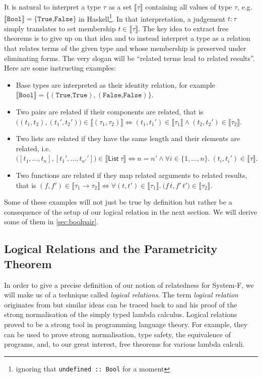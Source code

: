 \documentclass[12pt]{article}
\theoremstyle{plain}
\theoremstyle{definition}
\newcommand{\fromto}[2]{\{#1,\dotsc,#2\}}
\newcommand{\denot}[1]{\llbracket#1\rrbracket}
\newcommand{\listt}[1]{\mathsf{List}~#1}
\newcommand{\haskell}[1]{\texttt{#1}}
\begin{document}
It is natural to interpret a type $\tau$ as a set $\denot{\tau}$ containing all values of type $\tau$, e.g. $\denot{\texttt{Bool}}=\{\texttt{True,False}\}$ in Haskell\footnote{ignoring that \haskell{undefined :: Bool} for a moment}.
In that interpretation, a judgement $t : \tau$ simply translates to set membership $t\in\denot{\tau}$.
The key idea to extract free theorems is to give up on that idea and to instead interpret a type as a relation that relates terms of the given type and whose membership is preserved under eliminating forms.
The very slogan will be ``related terms lead to related results''.
Here are some instructing examples:
\begin{itemize}
  \item Base types are interpreted as their identity relation,
    for example\\
    $\denot{\haskell{Bool}}=\{(\haskell{True,True}),(\haskell{False,False})\}$.
  \item Two pairs are related if their components are related, that is\\ $\bigl((t_1,t_2),(t_1',t_2')\bigr)\in\denot{(\tau_1,\tau_2)} \iff (t_1,t_1')\in\denot{\tau_1}\land (t_2,t_2')\in\denot{\tau_2}$.
  \item Two lists are related if they have the same length and their elements are related, i.e.\ $\bigl([t_1,\dotsc,t_n],[t_1',\dotsc,t_{n'}']\bigr)\in \denot{\listt{\tau}} \iff n = n' \land \forall i\in\fromto{1}{n}.\ (t_i,t_i')\in \denot{\tau}$.
  \item Two functions are related if they map related arguments to related results, that is $(f,f')\in \denot{\tau_1 \to \tau_2} \iff \forall (t,t')\in \denot{\tau_1}.~\bigl(f\, t, f'\, t'\bigr)\in\denot{\tau_2}$.
\end{itemize}
Some of these examples will not just be true by definition but rather be a consequence of
the setup of our logical relation in the next section.
We will derive some of them in \cref{sec:boolpair}.

\subsection{Logical Relations and the Parametricity Theorem}\label{sec:logicalrel}

In order to give a precise definition of our notion of relatedness for System-F,
we will make us of a technique called \emph{logical relations}.
The term \emph{logical relation} originates from \citet{plotkin1973lambda} but similar ideas can be traced back to \citet{tait1967intensional} and his proof of the strong normalisation of the simply typed lambda calculus.
Logical relations proved to be a strong tool in programming language theory.
For example, they can be used to prove strong normalisation, type safety, the equivalence of programs, and, to our great interest, free theorems for various lambda calculi.
\end{document}
